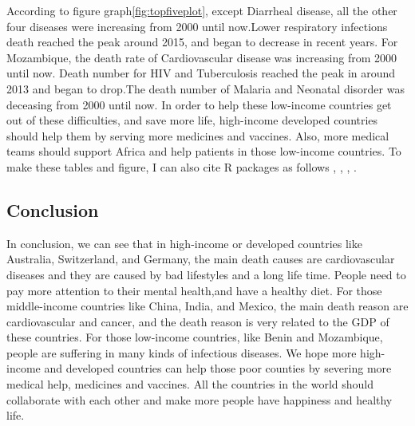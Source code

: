 \documentclass[11pt,a4paper,]{article}
\begin{document}
According to figure graph\ref{fig:topfiveplot}, except Diarrheal disease, all the other four diseases were increasing from 2000 until now.Lower respiratory infections death reached the peak around 2015, and began to decrease in recent years.
For Mozambique, the death rate of Cardiovascular disease was increasing from 2000 until now. Death number for HIV and Tuberculosis reached the peak in around 2013 and began to drop.The death number of Malaria and Neonatal disorder was deceasing from 2000 until now.
In order to help these low-income countries get out of these difficulties, and save more life, high-income developed countries should help them by serving more medicines and vaccines. Also, more medical teams should support Africa and help patients in those low-income countries.
To make these tables and figure, I can also cite R packages as follows \textcite{tidyverse}, \textcite{ggplot2}, \textcite{readr}, \textcite{gridExtra}.

\hypertarget{conclusion}{%
\subsection{Conclusion}\label{conclusion}}

In conclusion, we can see that in high-income or developed countries like Australia, Switzerland, and Germany, the main death causes are cardiovascular diseases and they are caused by bad lifestyles and a long life time. People need to pay more attention to their mental health,and have a healthy diet. For those middle-income countries like China, India, and Mexico, the main death reason are cardiovascular and cancer, and the death reason is very related to the GDP of these countries. For those low-income countries, like Benin and Mozambique, people are suffering in many kinds of infectious diseases. We hope more high-income and developed countries can help those poor counties by severing more medical help, medicines and vaccines. All the countries in the world should collaborate with each other and make more people have happiness and healthy life.

\printbibliography
\end{document}
